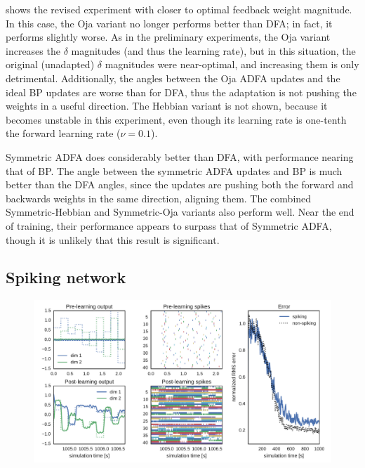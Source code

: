  shows the revised experiment
with closer to optimal feedback weight magnitude.
In this case, the Oja variant no longer performs better than DFA;
in fact, it performs slightly worse.
As in the preliminary experiments,
the Oja variant increases the $\delta$ magnitudes (and thus the learning rate),
but in this situation,
the original (unadapted) $\delta$ magnitudes were near-optimal,
and increasing them is only detrimental.
Additionally, the angles between the Oja ADFA updates
and the ideal BP updates are worse than for DFA,
thus the adaptation is not pushing the weights in a useful direction.
The Hebbian variant is not shown,
because it becomes unstable in this experiment,
even though its learning rate is one-tenth the forward learning rate ($\nu = 0.1$).

Symmetric ADFA does considerably better than DFA,
with performance nearing that of BP.
The angle between the symmetric ADFA updates and BP
is much better than the DFA angles,
since the updates are pushing both the forward and backwards weights
in the same direction, aligning them.
The combined Symmetric-Hebbian and Symmetric-Oja variants
also perform well.
Near the end of training,
their performance appears to surpass that of Symmetric ADFA,
though it is unlikely that this result is significant.


\subsection{Spiking network}

\begin{figure}
  \centering
  \includegraphics[width=\columnwidth]{../cosyne_poster/figures/online.pdf}
\end{figure}


